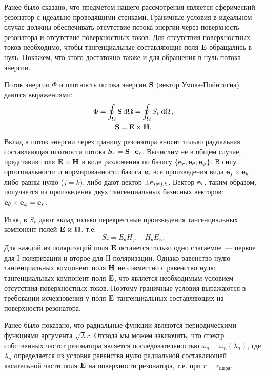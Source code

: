\documentclass[12pt,a4paper]{article}
\begin{document}
        Ранее было сказано, что предметом нашего рассмотрения является сферический резонатор с идеально проводящими стенками. Граничные условия в идеальном случае должны обеспечивать отсутствие потока энергии через поверхность резонатора и отсутствие поверхностных токов. Для отсутствия поверхностных токов необходимо, чтобы тангенциальные составляющие поля $\vb{E}$ обращались в нуль. Покажем, что этого достаточно также и для обращения в нуль потока энергии.

        Поток энергии $\Phi$ и плотность потока энергии $\vb{S}$ (вектор Умова-Пойнтигна) даются выражениями:
        \begin{equation}\begin{gathered}
            \Phi = \oint_\Omega \vb{S} \dd{\vb{\Omega}}
                 = \oint_\Omega S_r \dd{\Omega} , \\
            \vb{S} = \vb{E} \times \vb{H} .
        \end{gathered}\end{equation}
        Вклад в поток энергии через границу резонатора вносит только радиальная составляющая плотности потока $S_r = \vb{S} \cdot \vb{e}_r$. Вычислим ее в общем случае, представив поля $\vb{E}$ и $\vb{H}$ в виде разложения по базису $\qty{ \vb{e}_r, \vb{e}_\theta, \vb{e}_\varphi }$. В силу ортогональности и нормированности базиса $\vb{e}_i$ все произведения вида $\vb{e}_j \times \vb{e}_k$ либо равны нулю ($j = k$), либо дают вектор $\pm \vb{e}_{i \neq j,k}$. Вектор $\vb{e}_r$, таким образом, получается из произведения двух тангенциальных базисных векторов: $\vb{e}_\theta \times \vb{e}_\varphi = \vb{e}_r$.

        Итак, в $S_r$ дают вклад только перекрестные произведения тангенциальных компонент полей $\vb{E}$ и $\vb{H}$, т.е.
        \begin{equation}
            S_r = E_\theta H_\varphi - H_\theta E_\varphi .
        \end{equation}
        Для каждой из поляризаций поля $\vb{E}$ останется только одно слагаемое~--- первое для $\mathrm{I}$ поляризации и второе для $\mathrm{II}$ поляризации. Однако равенство нулю тангенциальных компонент поля $\vb{H}$ не совместно с равенство нулю тангенциальных компонент поля $\vb{E}$, что является необходимым условием отсутствия поверхностных токов. Поэтому граничные условия выражаются в требовании исчезновения у поля $\vb{E}$ тангенциальных составляющих на поверхности резонатора.

        Ранее было показано, что радиальные функции являются периодическими функциями аргумента $\sqrt\lambda r$. Отсюда мы можем заключить, что спектр собственных частот резонатора является последовательностью $\omega_n = \omega_n(\lambda_n)$, где $\lambda_n$ определяется из условия равенства нулю радиальной составляющей касательной части поля $\vb{E}$ на поверхности резонатора, т.е. при $r = r_\text{шара}$.
\end{document}

